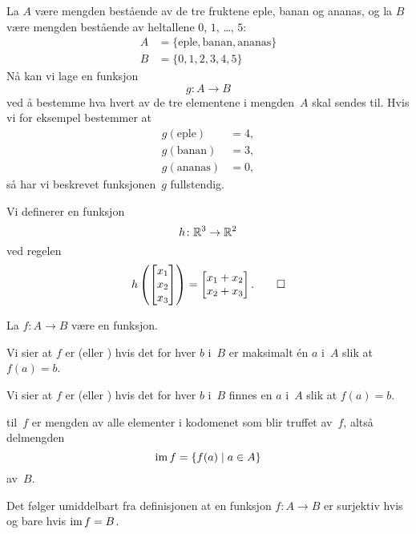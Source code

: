 \begin{ex}
\label{ex:funksjon2}
La $A$ være mengden bestående av de tre fruktene eple, banan og
ananas, og la $B$ være mengden bestående av heltallene $0$, $1$,
\ldots, $5$:
\begin{align*}
A &= \{ \text{eple}, \text{banan}, \text{ananas} \} \\
B &= \{ 0, 1, 2, 3, 4, 5 \}
\end{align*}
Nå kan vi lage en funksjon
\[
g \colon A \to B
\]
ved å bestemme hva hvert av de tre elementene i mengden~$A$ skal
sendes til.  Hvis vi for eksempel bestemmer at
\begin{align*}
g(\text{eple}) &= 4, \\
g(\text{banan}) &= 3, \\
g(\text{ananas}) &= 0,
\end{align*}
så har vi beskrevet funksjonen~$g$ fullstendig.
\end{ex}

\begin{ex}
\label{ex:funksjon3}
Vi definerer en funksjon
\[
h \colon \mathbb{R}^3 \to \mathbb{R}^2
\]
ved regelen
\[
h\left( \begin{bmatrix} x_1 \\ x_2 \\ x_3 \end{bmatrix} \right)
= \begin{bmatrix} x_1 + x_2 \\ x_2 + x_3 \end{bmatrix}.
\qedhere
\]
\end{ex}


\begin{defn}
La $f \colon A \to B$ være en funksjon.

Vi sier at $f$ er  (eller ) hvis
det for hver $b$ i~$B$ er maksimalt én $a$ i~$A$ slik at $f(a) = b$.

Vi sier at $f$ er  (eller ) hvis
det for hver $b$ i~$B$ finnes en $a$ i~$A$ slik at $f(a) = b$.

 til~$f$ er mengden av alle elementer i kodomenet som
blir truffet av~$f$, altså delmengden
\[
\operatorname{im} f = \{ f(a) \mid a \in A \}
\]
av~$B$.
\end{defn}

Det følger umiddelbart fra definisjonen at en funksjon
$f \colon A \to B$ er surjektiv hvis og bare hvis $\operatorname{im} f = B$.

